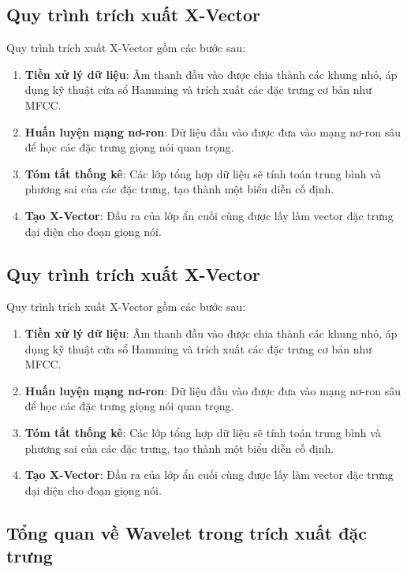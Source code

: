 \documentclass{article}
\begin{document}
\subsection{Quy trình trích xuất X-Vector}

Quy trình trích xuất X-Vector gồm các bước sau:

\begin{enumerate}
    \item \textbf{Tiền xử lý dữ liệu}: Âm thanh đầu vào được chia thành các khung nhỏ, áp dụng kỹ thuật cửa sổ Hamming và trích xuất các đặc trưng cơ bản như MFCC.
    \item \textbf{Huấn luyện mạng nơ-ron}: Dữ liệu đầu vào được đưa vào mạng nơ-ron sâu để học các đặc trưng giọng nói quan trọng.
    \item \textbf{Tóm tắt thống kê}: Các lớp tổng hợp dữ liệu sẽ tính toán trung bình và phương sai của các đặc trưng, tạo thành một biểu diễn cố định.
    \item \textbf{Tạo X-Vector}: Đầu ra của lớp ẩn cuối cùng được lấy làm vector đặc trưng đại diện cho đoạn giọng nói.
\end{enumerate}


\subsection{Quy trình trích xuất X-Vector}

Quy trình trích xuất X-Vector gồm các bước sau:

\begin{enumerate}
    \item \textbf{Tiền xử lý dữ liệu}: Âm thanh đầu vào được chia thành các khung nhỏ, áp dụng kỹ thuật cửa sổ Hamming và trích xuất các đặc trưng cơ bản như MFCC.
    \item \textbf{Huấn luyện mạng nơ-ron}: Dữ liệu đầu vào được đưa vào mạng nơ-ron sâu để học các đặc trưng giọng nói quan trọng.
    \item \textbf{Tóm tắt thống kê}: Các lớp tổng hợp dữ liệu sẽ tính toán trung bình và phương sai của các đặc trưng, tạo thành một biểu diễn cố định.
    \item \textbf{Tạo X-Vector}: Đầu ra của lớp ẩn cuối cùng được lấy làm vector đặc trưng đại diện cho đoạn giọng nói.
\end{enumerate}


\subsection{Tổng quan về Wavelet trong trích xuất đặc trưng}
\end{document}
